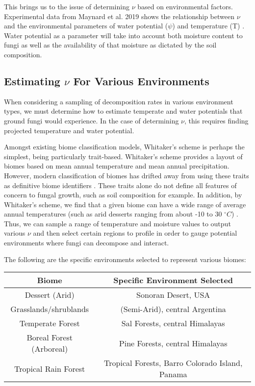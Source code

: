 \documentclass{article}
\begin{document}
This brings us to the issue of determining $\nu$ based on environmental factors. Experimental data from Maynard et al. 2019 shows the relationship between $\nu$ and the environmental parameters of water potential ($\psi$) and temperature (T) \cite{Maynard2019}.  Water potential as a parameter will take into account both moisture content to fungi as well as the availability of that moisture as dictated by the  soil composition.

\subsection{Estimating $\nu$ For Various Environments}

When considering a sampling of decomposition rates in various environment types, we must determine how to estimate temperate and water potentials that ground fungi would experience. In the case of determining $\nu$, this requires finding projected temperature and water potential.


Amongst existing biome classification models, Whitaker's scheme \cite{Whittaker1970} is perhaps the simplest, being particularly trait-based. Whitaker's scheme provides a layout of biomes based on mean annual temperature and mean annual precipitation. However, modern classification of biomes has drifted away from using these traits as definitive biome identifiers \cite{Mucina2018}. These traits alone do not define all features of concern to fungal growth, such as soil composition for example. In addition, by Whitaker's scheme, we find that a given biome can have a wide range of average annual temperatures (such as arid desserts ranging from about -10 to 30 $^{\circ}C$) \cite{Whittaker1970}. Thus, we can sample a range of temperature and moisture values to output various $\nu$ and then select certain regions to profile in order to gauge potential environments where fungi can decompose and interact.

The following are the specific environments selected to represent various biomes:

\begin{savenotes}
\begin{table}[H]
\begin{center}
 \begin{tabular}{|c c|} 
 \hline
 Biome & Specific Environment Selected \\ [0.5ex] 
 \hline\hline
 Dessert (Arid) & Sonoran Desert, USA \\ 
 \hline
 Grasslands/shrublands & (Semi-Arid), central Argentina\\
 \hline
 Temperate Forest & Sal Forests, central Himalayas\\
 \hline
 Boreal Forest (Arboreal) & Pine Forests, central Himalayas\\
 \hline
 Tropical Rain Forest & Tropical Forests, Barro Colorado Island, Panama \\
 \hline
\end{tabular}
\end{center}
\end{table}
\end{savenotes}
\end{document}
